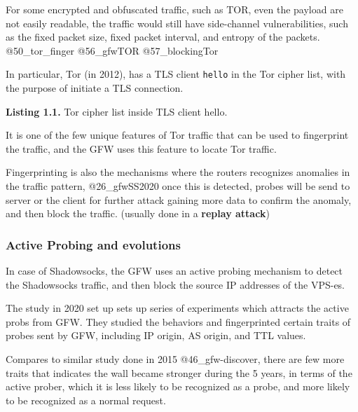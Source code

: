 For some encrypted and obfuscated traffic, such as TOR, even the payload
are not easily readable, the traffic would still have side-channel
vulnerabilities, such as the fixed packet size, fixed packet interval,
and entropy of the packets. @50\_tor\_finger @56\_gfwTOR
@57\_blockingTor

In particular, Tor (in 2012), has a TLS client \texttt{hello} in the Tor
cipher list, with the purpose of initiate a TLS connection.

\begin{Shaded}
\begin{Highlighting}[]
\end{Highlighting}
\end{Shaded}

\textbf{Listing 1.1.} Tor cipher list inside TLS client hello.

It is one of the few unique features of Tor traffic that can be used to
fingerprint the traffic, and the GFW uses this feature to locate Tor
traffic.

Fingerprinting is also the mechanisms where the routers recognizes
anomalies in the traffic pattern, @26\_gfwSS2020 once this is detected,
probes will be send to server or the client for further attack gaining
more data to confirm the anomaly, and then block the traffic. (usually
done in a \textbf{replay attack})

\hypertarget{active-probing-and-evolutions}{%
\subsubsection{Active Probing and
evolutions}\label{active-probing-and-evolutions}}

In case of Shadowsocks, the GFW uses an active probing mechanism to
detect the Shadowsocks traffic, and then block the source IP addresses
of the VPS-es.

The study in 2020 set up sets up series of experiments which attracts
the active probs from GFW. They studied the behaviors and fingerprinted
certain traits of probes sent by GFW, including IP origin, AS origin,
and TTL values.

Compares to similar study done in 2015 @46\_gfw-discover, there are few
more traits that indicates the wall became stronger during the 5 years,
in terms of the active prober, which it is less likely to be recognized
as a probe, and more likely to be recognized as a normal request.

